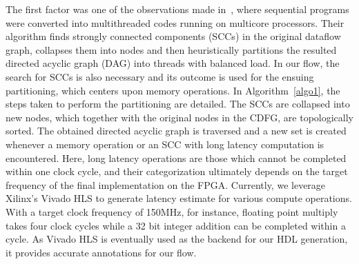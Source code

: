 \begin{algorithm}[t]
\begin{algorithmic}[1]
  
  
  \end{algorithmic}
\end{algorithm}

The first factor was one of the observations made 
in~\cite{dswp}, where sequential programs were converted into multithreaded
codes running on multicore processors. Their algorithm
finds strongly connected components (SCCs) in the
original dataflow graph, collapses them into nodes and then
heuristically partitions the resulted directed acyclic graph
(DAG) into threads with balanced load. In our flow, the search
for SCCs is also necessary and its outcome is used for the
ensuing partitioning, which centers upon memory operations.
In Algorithm~\ref{algo1}, the steps taken to perform the partitioning are detailed.
The SCCs are collapsed into new nodes, which together with the original nodes in the CDFG, are topologically
sorted. The obtained directed acyclic graph is traversed and a new set is created whenever a memory operation
or an SCC with long latency computation
is encountered. Here, long latency operations are those which cannot be completed within
one clock cycle, and
their categorization ultimately depends on the target frequency
of the final implementation on the FPGA. Currently, we
leverage Xilinx’s Vivado HLS to generate latency estimate for
various compute operations. With a target clock frequency of
150MHz, for instance, floating point multiply takes four clock
cycles while a 32 bit integer addition can be completed within
a cycle. As Vivado HLS is eventually used as the backend for
our HDL generation, it provides accurate annotations for our
flow.

